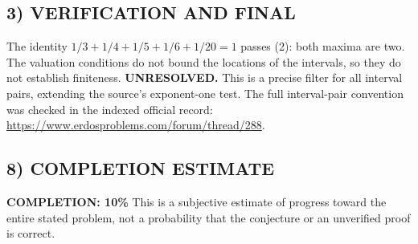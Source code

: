 \subsection*{3) VERIFICATION AND FINAL}
The identity $1/3+1/4+1/5+1/6+1/20=1$ passes (2): both maxima are two.
The valuation conditions do not bound the locations of the intervals, so
they do not establish finiteness. \textbf{UNRESOLVED.} This is a precise
filter for all interval pairs, extending the source's exponent-one test.
The full interval-pair convention was checked in the indexed official
record: \url{https://www.erdosproblems.com/forum/thread/288}.

\subsection*{8) COMPLETION ESTIMATE}
\textbf{COMPLETION: 10\%}
This is a subjective estimate of progress toward the entire stated problem, not a probability that the conjecture or an unverified proof is correct.
